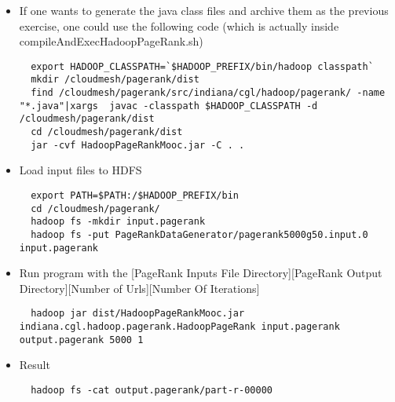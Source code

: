 \begin{itemize}
\item
  If one wants to generate the java class files and archive them as the
  previous exercise, one could use the following code (which is actually
  inside compileAndExecHadoopPageRank.sh)

\begin{lstlisting}
  export HADOOP_CLASSPATH=`$HADOOP_PREFIX/bin/hadoop classpath`
  mkdir /cloudmesh/pagerank/dist
  find /cloudmesh/pagerank/src/indiana/cgl/hadoop/pagerank/ -name "*.java"|xargs  javac -classpath $HADOOP_CLASSPATH -d /cloudmesh/pagerank/dist
  cd /cloudmesh/pagerank/dist
  jar -cvf HadoopPageRankMooc.jar -C . .
\end{lstlisting}
\item
  Load input files to HDFS

\begin{lstlisting}
  export PATH=$PATH:/$HADOOP_PREFIX/bin
  cd /cloudmesh/pagerank/
  hadoop fs -mkdir input.pagerank
  hadoop fs -put PageRankDataGenerator/pagerank5000g50.input.0 input.pagerank
\end{lstlisting}
\item
  Run program with the {[}PageRank Inputs File Directory{]}{[}PageRank
  Output Directory{]}{[}Number of Urls{]}{[}Number Of Iterations{]}

\begin{lstlisting}
  hadoop jar dist/HadoopPageRankMooc.jar indiana.cgl.hadoop.pagerank.HadoopPageRank input.pagerank output.pagerank 5000 1
\end{lstlisting}
\item
  Result

\begin{lstlisting}
  hadoop fs -cat output.pagerank/part-r-00000
\end{lstlisting}
\end{itemize}

